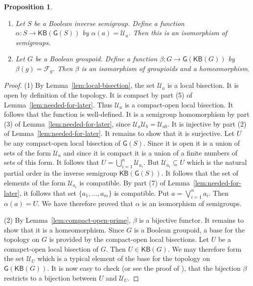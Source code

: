 \documentclass[a4paper]{amsart}
\newtheorem{proposition}[theorem]{Proposition}
\begin{document}
\begin{proposition}\label{prop:isomorphism-of-structures} \mbox{}
\begin{enumerate}
\item Let $S$ be a Boolean inverse semigroup. Define a function $\alpha \colon S \rightarrow \mathsf{KB} (\mathsf{G}(S))$ by $\alpha (a) = \mathscr{U}_{a}$.
Then this is an isomorphism of semigroups.
\item Let $G$ be a Boolean groupoid. Define a function $\beta \colon G \rightarrow \mathsf{G} (\mathsf{KB}(G))$  by $\beta (g) = \mathscr{F}_{g}$.
Then $\beta$ is an isomorphism of groupioids and a homeomorphism.
\end{enumerate}
\end{proposition}
\begin{proof} (1) By Lemma~\ref{lem:local-bisection}, the set $\mathscr{U}_{a}$ is a local bisection.
It is open by definition of the topology.
It is compact by part (5) of Lemma~\ref{lem:needed-for-later}.
Thus $\mathscr{U}_{a}$ is a compact-open local bisection.
It follows that the function is well-defined.
It is a semigroup homomorphism by part (3) of Lemma~\ref{lem:needed-for-later}, since $\mathscr{U}_{a}\mathscr{U}_{b} = \mathscr{U}_{ab}$.
It is injective by part (2) of Lemma~\ref{lem:needed-for-later}.
It remains to show that it is surjective.
Let $U$ be any compact-open local bisection of $\mathsf{G}(S)$.
Since it is open it is a union of sets of the form $\mathscr{U}_{a}$ and since it is compact
it is a union of a finite numbers of sets of this form.
It follows that $U = \bigcup_{i=1}^{n} \mathscr{U}_{a_{i}}$.
But $\mathscr{U}_{a_{i}} \subseteq U$ which is the natural partial order in the inverse semigroup  $\mathsf{KB} (\mathsf{G}(S))$.
It follows that the set of elements of the form $\mathscr{U}_{a_{i}}$ is compatible.
By part (7) of Lemma~\ref{lem:needed-for-later},
it follows that set $\{a_{1}, \ldots, a_{m}\}$ is compatible.
Put $a = \bigvee_{i=1}^{n}a_{i}$.
Then $\alpha (a) = U$.
We have therefore proved that $\alpha$ is an isomorphism of semigroups.
  
(2) By Lemma~\ref{lem:compact-open-prime}, 
$\beta$ is a bijective functor.
It remains to show that it is a homeomorphism.
Since $G$ is a Boolean groupoid, a base for the topology on $G$ is provided by the compact-open local bisections.
Let $U$ be a comapct-open local bisection of $G$.
Then $U \in \mathsf{KB}(G)$.
We may therefore form the set $\mathscr{U}_{U}$ which is a typical element of the base for the topology 
on $\mathsf{G}(\mathsf{KB}(G))$.
It is now easy to check (or see the proof of \cite[Part (1) of Proposition 2.23]{Lawson3}),
that the bijection $\beta$ restricts to a bijection between $U$ and $\mathscr{U}_{U}$. 
\end{proof}
\end{document}
